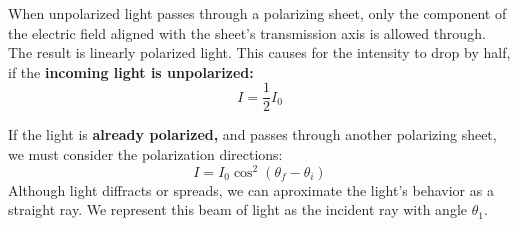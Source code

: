 \documentclass[11pt]{article}
\begin{document}
 \begin{minipage}{0.25\textwidth}
\centering
{}
\end{minipage}
\hfill
\begin{minipage}{0.7\textwidth}
\vspace{0.1cm}
When unpolarized light passes through a polarizing sheet, only the component of the electric field aligned with the sheet’s transmission axis is allowed through. The result is linearly polarized light.
This causes for the intensity to drop by half, if the \textbf{incoming light is unpolarized:}
\begin{equation}
        I = \frac{1}{2} I_0 \tag{one-half rule}
        \end{equation}

\end{minipage}
\vspace{2em}

\noindent If the light is \textbf{already polarized,} and passes through another polarizing sheet,
    we must consider the polarization directions:
    \begin{equation}
        I = I_0 \cos^2(\theta_f - \theta_i ) \tag{cosine-squared rule}
    \end{equation}
Although light diffracts or spreads, we can aproximate the light's behavior as a straight ray.
We represent this beam of light as the incident ray with angle $\theta_1$.
\end{document}
